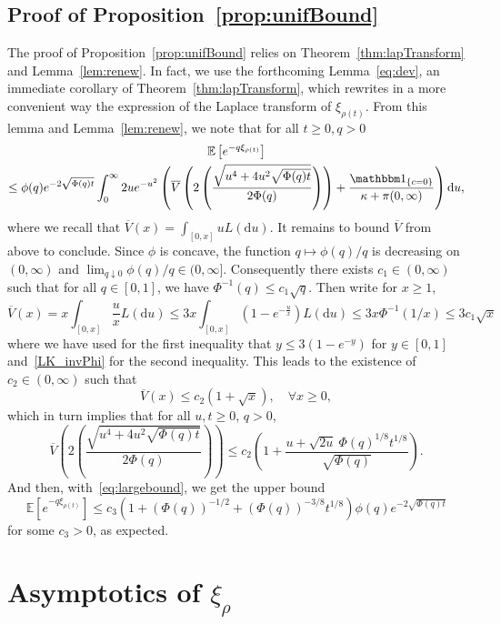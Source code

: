 \documentclass[10pt]{amsart}
\theoremstyle{definition}
\numberwithin{equation}{section}
\newcommand{\bbE}{\mathbb{E}}
\newcommand{\dd}{\mathrm{d}}
\renewcommand{\bar}[1]{\overline{#1}}
\let\oldforall\forall
\renewcommand*{\forall}{\mathrel{\oldforall}}
\begin{document}
\subsection{Proof of Proposition~\ref{prop:unifBound}}\label{sec:bounds}

The proof of Proposition~\ref{prop:unifBound} relies on Theorem~\ref{thm:lapTransform} and Lemma~\ref{lem:renew}. In fact, we use the forthcoming Lemma~\ref{eq:dev}, an immediate corollary of Theorem~\ref{thm:lapTransform}, which rewrites in a more convenient way the expression of the Laplace transform of $\xi_{\rho(t)}$. From this lemma and Lemma~\ref{lem:renew}, we note that for all $t \geq 0,q>0$
\begin{multline}\label{eq:largebound}
\bbE\left[e^{-q\xi_{\rho(t)}}\right] \\
\leq \phi(q)
e^{-2 \sqrt{\Phi(q)t}}
\int_0^\infty 2u e^{-u^2}
\left(\bar V\left(2
\left(\frac{\sqrt{u^4+4u^2 \sqrt{\Phi(q) t}}}
{2 \Phi(q)} \right)\right)
+ \frac{\mathbbm 1_{\{c=0\}}}
{\kappa+\pi(0,\infty
)} \right)\dd u
,
\end{multline}
where we recall that $\bar V(x)=\int_{[0,x]}u L(\dd u)$. It remains to bound $\bar V$ from above to conclude. Since $\phi$ is concave, the function $q \mapsto \phi(q)/q$ is decreasing on $(0,\infty)$ and $\lim_{q \downarrow 0} \phi(q)/q \in (0,\infty]$. Consequently there exists $c_1 \in (0,\infty)$ such that for all $q \in [0,1]$, we have $\Phi^{-1}(q) \leq c_1 \sqrt q$. Then write for $x \geq 1$,
\[
\bar V(x) = x\int_{[0,x]} \frac{u}{x} L(\dd u) \leq 3 x \int_{[0,x]} \left(1-e^{- \frac{u}{x}} \right) L(\dd u) \leq 3 x \Phi^{-1}(1/x) \leq 3c_1 \sqrt x
\]
where we have used for the first inequality that $y \leq 3(1-e^{-y})$ for $y \in [0,1]$ and~\eqref{LK_invPhi} for the second inequality. This leads to the existence of $c_2 \in (0,\infty)$ such that
\[
\bar V(x) \leq c_2 \left(1 + \sqrt x\right), \quad \forall x \geq 0,
\]
which in turn implies that for all $u,t \geq 0$, $q>0$,
\[
\bar V\left(2 \left(\frac{\sqrt{u^4+4u^2 \sqrt{\Phi(q) t}}}{2 \Phi(q)} \right)\right) \leq c_2 \left(1 + \frac{u+\sqrt{2u} \ \Phi(q)^{1/8}t^{1/8}}{\sqrt{\Phi(q)}}\right).
\]
And then, with~\eqref{eq:largebound}, we get the upper bound
\[
\bbE\left[e^{-q\xi_{\rho(t)}}\right] \leq c_3\left(1+(\Phi(q))^{-1/2}+(\Phi(q))^{-3/8}t^{1/8} \right) \phi(q)e^{-2 \sqrt{\Phi(q)t}}
\]
for some $c_3>0$, as expected.
\section{Asymptotics of \texorpdfstring{$\xi_{\rho}$}{xiRho}}\label{sec:asymptotic_sub}
\end{document}
